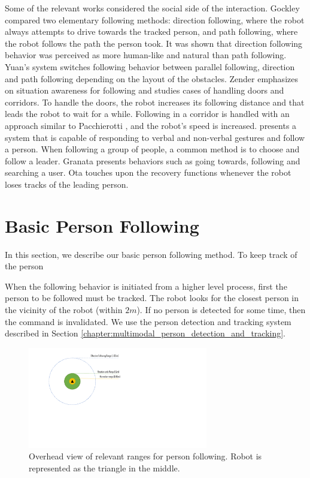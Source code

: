 Some of the relevant works considered the social side of the interaction. Gockley compared two elementary following methods: direction following, where the robot always attempts to drive towards the tracked person, and path following, where the robot follows the path the person took. It was shown that direction following behavior was perceived as more human-like and natural than path following. Yuan's \cite{yuan2008spatial} system switches following behavior between parallel following, direction and path following depending on the layout of the obstacles. Zender \cite{zender2007human} emphasizes on situation awareness for following and studies cases of handling doors and corridors. To handle the doors, the robot increases its following distance and that leads the robot to wait for a while. Following in a corridor is handled with an approach similar to Pacchierotti \cite{pacchierotti2005human}, and the robot's speed is increased. \cite{loper2009mobile} presents a system that is capable of responding to verbal and non-verbal gestures and follow a person. When following a group of people, a common method is to choose and follow a leader. Granata \cite{granata2012framework} presents behaviors such as going towards, following and searching a user. Ota \cite{ota2013recovery} touches upon the recovery functions whenever the robot loses tracks of the leading person.

\section{Basic Person Following}
\label{sec:following_basic_person_following}

In this section, we describe our basic person following method. To keep track of the person

When the following behavior is initiated from a higher level process, first the person to be followed must be tracked. The robot looks for the closest person in the vicinity of the robot (within $2m$). If no person is detected for some time, then the command is invalidated. We use the person detection and tracking system described in Section \ref{chapter:multimodal_person_detection_and_tracking}.

\begin{figure}[ht!]
\hspace*{4cm} 
\includegraphics[width=0.7\textwidth]{pics/following_ranges_cropped}
\caption{Overhead view of relevant ranges for person following. Robot is represented as the triangle in the middle.}
\label{fig:following_ranges}
\end{figure}

